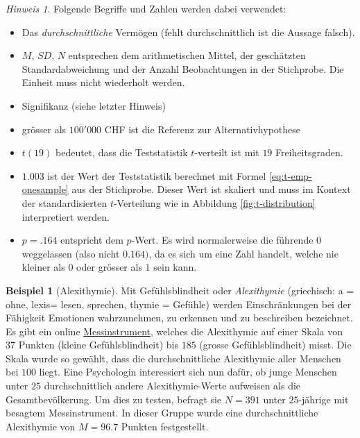 \documentclass[
]{book}
\providecommand{\tightlist}{%
  \setlength{\itemsep}{0pt}\setlength{\parskip}{0pt}}
\theoremstyle{definition}
\theoremstyle{definition}
\newtheorem{example}{Beispiel}[chapter]
\theoremstyle{definition}
\theoremstyle{definition}
\theoremstyle{remark}
\newtheorem*{remark}{Hinweis}
\begin{document}
\begin{caution}

\begin{remark}

Folgende Begriffe und Zahlen werden dabei verwendet:

\begin{itemize}
\tightlist
\item
  Das \emph{durchschnittliche} Vermögen (fehlt durchschnittlich ist die Aussage falsch).
\item
  \(M\), \(SD\), \(N\) entsprechen dem arithmetischen Mittel, der geschätzten Standardabweichung und der Anzahl Beobachtungen in der Stichprobe. Die Einheit muss nicht wiederholt werden.
\item
  Signifikanz (siehe letzter Hinweis)
\item
  grösser als \(100'000\) CHF ist die Referenz zur Alternativhypothese
\item
  \(t(19)\) bedeutet, dass die Teststatistik \(t\)-verteilt ist mit \(19\) Freiheitsgraden.
\item
  \(1.003\) ist der Wert der Teststatistik berechnet mit Formel \eqref{eq:t-emp-onesample} aus der Stichprobe. Dieser Wert ist skaliert und muss im Kontext der standardisierten \(t\)-Verteilung wie in Abbildung \ref{fig:t-distribution} interpretiert werden.
\item
  \(p = .164\) entspricht dem \(p\)-Wert. Es wird normalerweise die führende \(0\) weggelassen (also nicht \(0.164)\), da es sich um eine Zahl handelt, welche nie kleiner als \(0\) oder grösser als \(1\) sein kann.
\end{itemize}

\end{remark}

\end{caution}

\begin{example}[Alexithymie]
\protect\hypertarget{exm:alexithymie}{}\label{exm:alexithymie}Mit Gefühlsblindheit oder \emph{Alexithymie} (griechisch: a = ohne, lexis= lesen, sprechen, thymie = Gefühle) werden Einschränkungen bei der Fähigkeit Emotionen wahrzunehmen, zu erkennen und zu beschreiben bezeichnet. Es gibt ein online \href{https://www.alexithymie.com/de/}{Messinstrument}, welches die Alexithymie auf einer Skala von \(37\) Punkten (kleine Gefühlsblindheit) bis \(185\) (grosse Gefühlsblindheit) misst. Die Skala wurde so gewählt, dass die durchschnittliche Alexithymie aller Menschen bei \(100\) liegt. Eine Psychologin interessiert sich nun dafür, ob junge Menschen unter \(25\) durchschnittlich andere Alexithymie-Werte aufweisen als die Gesamtbevölkerung. Um dies zu testen, befragt sie \(N = 391\) unter \(25\)-jährige mit besagtem Messinstrument. In dieser Gruppe wurde eine durchschnittliche Alexithymie von \(M = 96.7\) Punkten festgestellt.
\end{example}
\end{document}
